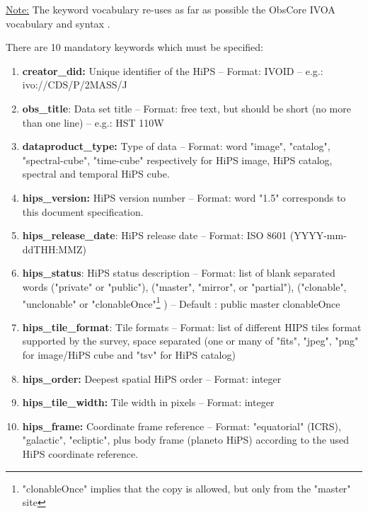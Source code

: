 \documentclass[11pt,a4paper]{ivoa}
\begin{document}
\underline{Note:} The keyword vocabulary re-uses as far as possible the ObsCore IVOA vocabulary and syntax \citep{2017ivoa.spec.0509L}. 

\medskip

There are 10 mandatory keywords which must be specified:
\begin{enumerate}[noitemsep,topsep=0pt,parsep=0pt,partopsep=0pt]
\item {\bf creator\_did:}  Unique identifier of the HiPS – Format: IVOID \citep{2016ivoa.spec.0523D} – e.g.: ivo://CDS/P/2MASS/J
\item {\bf obs\_title}: Data set title – Format: free text, but should be short (no more than one line) – e.g.: HST 110W
\item {\bf dataproduct\_type:} Type of data – Format: word "image", "catalog", "spectral-cube", "time-cube" respectively for HiPS image, HiPS catalog, spectral and temporal HiPS cube.
\item {\bf hips\_version:} HiPS version number – Format: word "1.5" corresponds to this document specification.
\item {\bf hips\_release\_date}: HiPS release date – Format: ISO 8601 (YYYY-mm-ddTHH:MMZ)
\item {\bf hips\_status}: HiPS status description – Format: list of blank separated words ("private" or "public"), ("master", "mirror", or "partial"), ("clonable", "unclonable" or "clonableOnce"\footnote{"clonableOnce" implies that the copy is allowed, but only from the "master" site} ) – Default : public master clonableOnce
\item {\bf hips\_tile\_format}: Tile formats – Format: list of different HIPS tiles format supported by the survey, space separated (one or many of "fits", "jpeg", "png" for image/HiPS cube and "tsv" for HiPS catalog)
\item {\bf hips\_order:} Deepest spatial HiPS order – Format: integer
\item {\bf hips\_tile\_width:} Tile width in pixels – Format: integer
\item {\bf hips\_frame:} Coordinate frame reference – Format: "equatorial" (ICRS), "galactic", "ecliptic", plus body frame (planeto HiPS) according to the used HiPS coordinate reference.
\end{enumerate}
\end{document}

